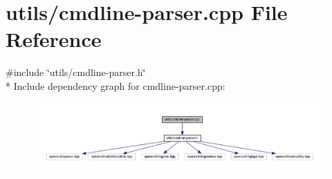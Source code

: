\hypertarget{cmdline-parser_8cpp}{}\section{utils/cmdline-\/parser.cpp File Reference}
\label{cmdline-parser_8cpp}
{\ttfamily \#include \char`\"{}utils/cmdline-\/parser.\+h\char`\"{}}\\*
Include dependency graph for cmdline-\/parser.cpp\+:
\nopagebreak
\begin{figure}[H]
\begin{center}
\leavevmode
\includegraphics[width=350pt]{cmdline-parser_8cpp__incl}
\end{center}
\end{figure}
